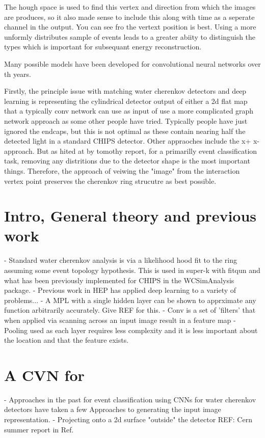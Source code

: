 The hough space is used to find this vertex and direction from which the images are produces, so it also made sense
to include this along with time as a seperate channel in the output. You can see fro the vertext position is best. Using
a more unformly distributes sample of events leads to a greater abiity to distinguish the types which is important
for subsequant energy reconstruction.

Many possible models have been developed for convolutional neural networks over th years.

Firstly, the principle issue with matching water cherenkov detectors and deep learning is representing the cylindrical
detector output of either a 2d flat map that a typically conv network can use as input of use a more complicated
graph network approach as some other people have tried. Typically people have just ignored the endcaps, but
this is not optimal as these contain nearing half the detected light in a standard CHIPS detector. Other appraoches
include the x+ x- approach. But as hited at by tomothy report, for a primarilly event classification task,
removing any distritions due to the detector shape is the most important things. Therefore, the approach of
veiwing the "image" from the interaction vertex point preserves the cherenkov ring strucutre as best possible.



\section{Intro, General theory and previous work}
- Standard water cherenkov analysis is via a likelihood hood fit to the ring assuming some event topology hypothesis.
This is used in super-k with fitqun and what has been previously implemented for CHIPS in the WCSimAnalysis package.
- Previous work in HEP has applied deep learning to a variety of problems...
- A MPL with a single hidden layer can be shown to apprximate any function arbitrarily accurately. Give REF for this.
- Conv is a set of 'filters' that when applied via scanning across an input image result in a feature map
- Pooling used as each layer requires less complexity and it is less important about the location and that the feature exists.

\section{A CVN for \chips}

- Approaches in the past for event classification using CNNs for water cherenkov detectors have taken a few Approaches
to generating the input image representation.
- Projecting onto a 2d surface "outside" the detector
REF: Cern summer report in Ref.~\cite{theodore2016}

